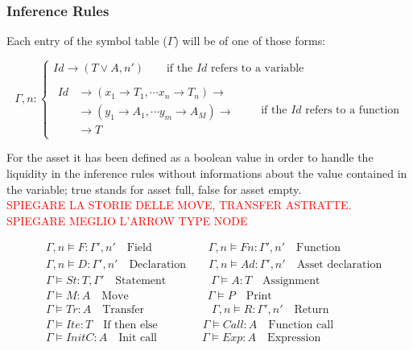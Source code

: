\documentclass[11pt]{article} %
\newcommand{\ES}{\textcolor{red}}
\begin{document}
\subsubsection{Inference Rules}
Each entry of the symbol table ($ \Gamma $) will be of one of those forms:

\begin{equation}
\Gamma, n :
	\begin{cases}
	Id \rightarrow ( T \lor A, n' ) \qquad \text{if the } Id \text{ refers to a variable} \\ \\
	\begin{split}
	Id & \rightarrow  (x_1 \rightarrow T_1,\cdots
          							 x_n \rightarrow T_n) \rightarrow \\
          		   &		\rightarrow (y_1 \rightarrow A_1,\cdots
          							 y_m \rightarrow A_M) \rightarrow \\
          		   &		\rightarrow T 
	\end{split} \qquad \text{if the } Id \text{ refers to a function}
	\end{cases}
\end{equation}

For the asset it has been defined as a boolean value in order to handle the liquidity in the inference rules without informations about the value contained in the variable; true stands for asset full, false for asset empty. \\
\ES{SPIEGARE LA STORIE DELLE MOVE, TRANSFER ASTRATTE.\\SPIEGARE MEGLIO L'ARROW TYPE NODE}

\medskip

\begin{equation}
\begin{split}
& \Gamma, n \models F  : \Gamma', n' \quad \text{Field} \qquad \qquad \quad 
\Gamma, n \models Fn : \Gamma', n' \quad \text{Function} \\
& \Gamma, n \models D : \Gamma', n' \quad \text{Declaration} \qquad 
\Gamma, n \models Ad : \Gamma', n' \quad \text{Asset declaration} \\
& \Gamma \models St : T, \Gamma' \quad \text{Statement} \qquad \qquad
\Gamma \models A : T \quad \text{Assignment} \\
& \Gamma \models M : A \quad \text{Move} \qquad \qquad \qquad \quad
\Gamma \models P   \quad \text{Print} \\
& \Gamma \models Tr : A \quad \text{Transfer} \qquad \qquad \qquad
\Gamma, n \models R : \Gamma', n'  \quad \text{Return} \\
& \Gamma \models Ite : T \quad \text{If then else} \qquad \qquad 
\Gamma \models Call : A \quad \text{Function call} \\
& \Gamma \models InitC : A \quad \text{Init call} \qquad \qquad 
\Gamma \models Exp : A \quad \text{Expression} \\
\end{split}
\end{equation}
\end{document}
